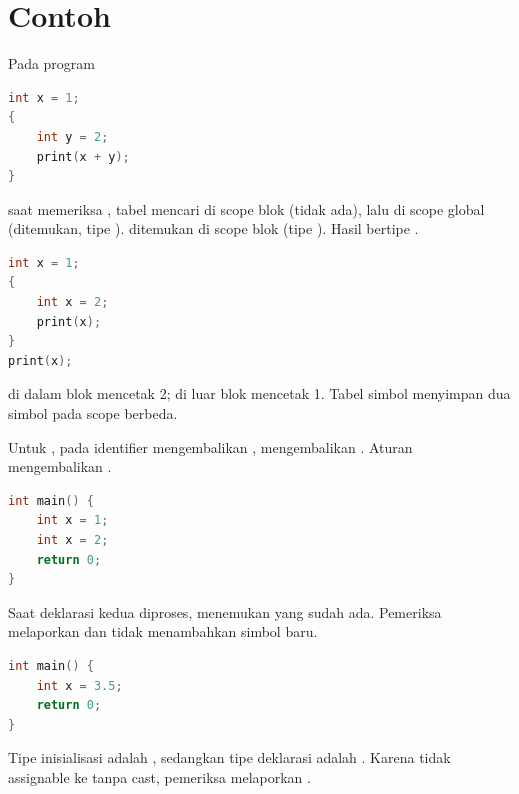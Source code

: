\section*{Contoh}

\begin{contoh}
Pada program
\begin{lstlisting}[language=C]
int x = 1;
{
    int y = 2;
    print(x + y);
}
\end{lstlisting}
saat memeriksa , tabel mencari  di scope blok
(tidak ada), lalu di scope global (ditemukan, tipe ).
 ditemukan di scope blok (tipe ). Hasil
 bertipe .
\end{contoh}

\begin{contoh}[Shadowing]
\begin{lstlisting}[language=C]
int x = 1;
{
    int x = 2;
    print(x);
}
print(x);
\end{lstlisting}
 di dalam blok mencetak 2;  di luar
blok mencetak 1. Tabel simbol menyimpan dua simbol  pada
scope berbeda.
\end{contoh}

\begin{contoh}
Untuk ,  pada
identifier  mengembalikan , 
mengembalikan . Aturan 
mengembalikan .
\end{contoh}

\begin{contoh}
\begin{lstlisting}[language=C]
int main() {
    int x = 1;
    int x = 2;
    return 0;
}
\end{lstlisting}
Saat deklarasi kedua diproses,  menemukan
 yang sudah ada. Pemeriksa melaporkan
 dan tidak menambahkan
simbol baru.
\end{contoh}

\begin{contoh}
\begin{lstlisting}[language=C]
int main() {
    int x = 3.5;
    return 0;
}
\end{lstlisting}
Tipe inisialisasi adalah , sedangkan tipe deklarasi
adalah . Karena  tidak assignable ke
 tanpa cast, pemeriksa melaporkan
.
\end{contoh}
